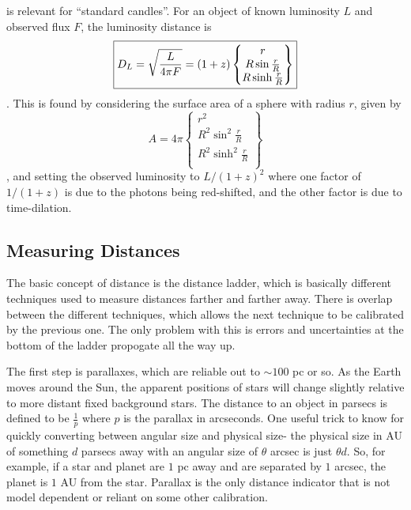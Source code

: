  is relevant for ``standard candles''.  For an object of
known luminosity $L$ and observed flux $F$, the luminosity distance is
\begin{dmath}\boxed{
    D_L = \sqrt{\frac{L}{4\pi F}} \nolinebreak
        = (1+z) \left\{\begin{matrix}
                r \\ R\sin\frac{r}{R} \\ R\sinh\frac{r}{R} \\
            \end{matrix}\right\}
}\end{dmath}.
This is found by considering the surface area of a sphere with radius $r$, given by
\begin{dmath}
    A = 4\pi\left\{\begin{matrix}
            r^2 \\ R^2\sin^2\frac{r}{R} \\ R^2\sinh^2\frac{r}{R} \\
        \end{matrix}\right\}
\end{dmath},
and setting the observed luminosity to $L/(1+z)^2$ where one factor of $1/(1+z)$ is due to
the photons being red-shifted, and the other factor is due to time-dilation.

\subsection{Measuring Distances}\label{sec:distance_ladder}
The basic concept of distance is the distance ladder, which is basically 
different techniques used to measure distances farther and farther away.  
There is overlap between the different techniques, which allows the next 
technique to be calibrated by the previous one.  The only problem with this 
is errors and uncertainties at the bottom of the ladder propogate all the 
way up.  

The first step is parallaxes, which are reliable out to $\sim100$ pc or so.  As 
the Earth moves around the Sun, the apparent positions of stars will change 
slightly relative to more distant fixed background stars.  The distance 
to an object in parsecs is defined to be $\frac{1}{p}$ where $p$ is the 
parallax in arcseconds.  One useful trick to know for quickly converting 
between angular size and physical size- the physical size in AU of something 
$d$ parsecs away with an angular size of $\theta$ arcsec is just $\theta d$.  
So, for example, if a star and planet are $1$ pc away and are separated by 
$1$ arcsec, the planet is $1$ AU from the star.  Parallax is the only 
distance indicator that is not model dependent or reliant on some other 
calibration.  

